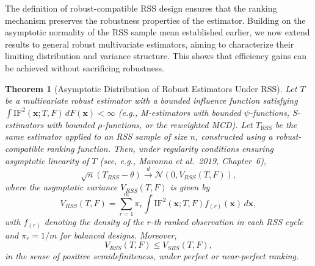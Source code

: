\documentclass[12pt]{article}
\newtheorem{theorem}{Theorem}[section]
\begin{document}
The definition of robust-compatible RSS design ensures that the ranking mechanism preserves the robustness properties of the estimator. Building on the asymptotic normality of the RSS sample mean established earlier, we now extend results to general robust multivariate estimators, aiming to characterize their limiting distribution and variance structure. This shows that efficiency gains can be achieved without sacrificing robustness.
{\sloppy
\begin{theorem}[Asymptotic Distribution of Robust Estimators Under RSS]
\label{thm:asymp_robust_rss}
Let $T$ be a multivariate robust estimator with a bounded influence function satisfying $\int \mathrm{IF}^2(\mathbf{x}; T, F)\, dF(\mathbf{x}) < \infty$ (e.g., M-estimators with bounded $\psi$-functions, S-estimators with bounded $\rho$-functions, or the reweighted MCD). Let $T_{\mathrm{RSS}}$ be the same estimator applied to an RSS sample of size $n$, constructed using a robust-compatible ranking function. Then, under regularity conditions ensuring asymptotic linearity of $T$ (see, e.g., Maronna et al.\ 2019, Chapter~6),
\begin{equation}
\sqrt{n}(T_{RSS} - \theta) \xrightarrow{d} \mathcal{N}(0, V_{RSS}(T, F)),
\end{equation}
where the asymptotic variance $V_{RSS}(T, F)$ is given by
\begin{equation}
V_{RSS}(T, F) = \sum_{r=1}^{m} \pi_r \int \mathrm{IF}^2(\mathbf{x}; T, F) f_{(r)}(\mathbf{x}) \, d\mathbf{x},
\end{equation}
with $f_{(r)}$ denoting the density of the $r$-th ranked observation in each RSS cycle and $\pi_r = 1/m$ for balanced designs. Moreover,
\begin{equation}
V_{RSS}(T, F) \leq V_{SRS}(T, F),
\end{equation}
in the sense of positive semidefiniteness, under perfect or near-perfect ranking.
\end{theorem}
}
\end{document}
